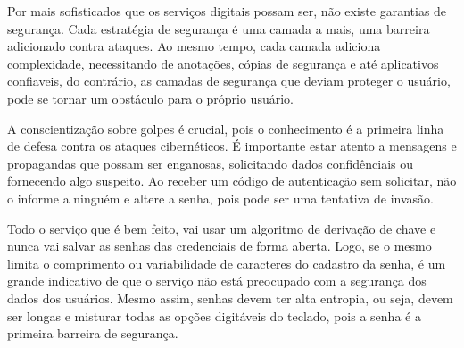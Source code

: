 \documentclass[12pt]{article}
\begin{document}
Por mais sofisticados que os serviços digitais possam ser, não existe garantias de segurança.
Cada estratégia de segurança é uma camada a mais, uma barreira adicionado contra ataques.
Ao mesmo tempo, cada camada adiciona complexidade, necessitando de anotações, cópias de
segurança e até aplicativos confiaveis, do contrário, as camadas de segurança que deviam
proteger o usuário, pode se tornar um obstáculo para o próprio usuário.

A conscientização sobre golpes é crucial, pois o conhecimento é a primeira linha de defesa contra
os ataques cibernéticos.
É importante estar atento a mensagens e propagandas que possam ser enganosas, solicitando dados
confidênciais ou fornecendo algo suspeito.
Ao receber um código de autenticação sem solicitar, não o informe a ninguém e altere a senha,
pois pode ser uma tentativa de invasão.

Todo o serviço que é bem feito, vai usar um algoritmo de derivação de chave e nunca vai salvar
as senhas das credenciais de forma aberta.
Logo, se o mesmo limita o comprimento ou variabilidade de caracteres do cadastro da senha, é um
grande indicativo de que o serviço não está preocupado com a segurança dos dados dos usuários.
Mesmo assim, senhas devem ter alta entropia, ou seja, devem ser longas e misturar todas as opções
digitáveis do teclado, pois a senha é a primeira barreira de segurança.



\end{document}
